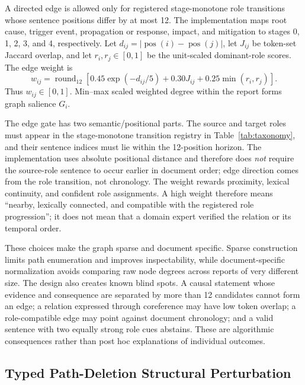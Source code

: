 \documentclass[applsci,article,submit,moreauthors]{Definitions/mdpi}
\begin{document}
A directed edge is allowed only for registered stage-monotone role transitions whose sentence positions differ by at most 12. The implementation maps root cause, trigger event, propagation or response, impact, and mitigation to stages 0, 1, 2, 3, and 4, respectively. Let $d_{ij}=|\operatorname{pos}(i)-\operatorname{pos}(j)|$, let $J_{ij}$ be token-set Jaccard overlap, and let $r_i,r_j\in[0,1]$ be the unit-scaled dominant-role scores. The edge weight is
\[
w_{ij}=\operatorname{round}_{12}\!\left[0.45\exp(-d_{ij}/5)+0.30J_{ij}+0.25\min(r_i,r_j)\right].
\]
Thus $w_{ij}\in[0,1]$. Min--max scaled weighted degree within the report forms graph salience $G_i$.

The edge gate has two semantic/positional parts. The source and target roles must appear in the stage-monotone transition registry in Table~\ref{tab:taxonomy}, and their sentence indices must lie within the 12-position horizon. The implementation uses absolute positional distance and therefore does \emph{not} require the source-role sentence to occur earlier in document order; edge direction comes from the role transition, not chronology. The weight rewards proximity, lexical continuity, and confident role assignments. A high weight therefore means ``nearby, lexically connected, and compatible with the registered role progression''; it does not mean that a domain expert verified the relation or its temporal order.

These choices make the graph sparse and document specific. Sparse construction limits path enumeration and improves inspectability, while document-specific normalization avoids comparing raw node degrees across reports of very different size. The design also creates known blind spots. A causal statement whose evidence and consequence are separated by more than 12 candidates cannot form an edge; a relation expressed through coreference may have low token overlap; a role-compatible edge may point against document chronology; and a valid sentence with two equally strong role cues abstains. These are algorithmic consequences rather than post hoc explanations of individual outcomes.

\subsection{Typed Path-Deletion Structural Perturbation}
\end{document}

